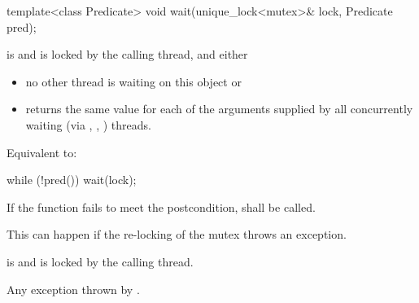%
\begin{itemdecl}
template<class Predicate>
  void wait(unique_lock<mutex>& lock, Predicate pred);
\end{itemdecl}
\begin{itemdescr}
 \pnum \requires {} is  and  is
        locked by the calling thread, and either

        \begin{itemize}
         \item no other thread is waiting on this  object or
         \item {} returns the same value for each of the 
                arguments supplied by all concurrently waiting (via ,
                , ) threads.
        \end{itemize}

 \pnum \effects Equivalent to:
\begin{codeblock}
while (!pred())
  wait(lock);
\end{codeblock}

 \pnum \remarks
        If the function fails to meet the postcondition, 
        shall be called.
        \begin{note} This can happen if the re-locking of the mutex throws an exception. \end{note}

 \pnum \postconditions {} is  and 
        is locked by the calling thread.

 \pnum \throws Any exception thrown by .
\end{itemdescr}


